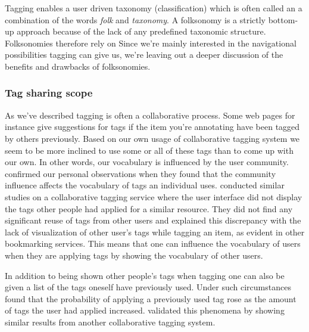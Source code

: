 Tagging enables a user driven taxonomy (classification)
which is often called an \dash{}a combination of the words
\emph{folk} and \emph{taxonomy}. A folksonomy is a strictly bottom-up
approach because of the lack of any predefined taxonomic structure.
Folksonomies therefore rely on 
Since we're mainly interested in the navigational possibilities tagging can
give us, we're leaving out a deeper discussion of the benefits and drawbacks
of folksonomies.%

\subsubsection{Tag sharing \oldand scope}
\label{section:social.navigation.applied.forms.tagging.sharing}

As we've described tagging is often a collaborative process. Some web pages
for instance give suggestions for tags if the item you're annotating have
been tagged by others previously. Based on our own usage of collaborative
tagging system we seem to be more inclined to use some or all of these tags
than to come up with our own. In other words, our vocabulary is influenced
by the user community. \citet[]{sen06} confirmed our personal
observations when they found that the community influence affects the
vocabulary of tags an individual uses. \citet[]{farooq07} conducted
similar studies on a collaborative tagging service where the user interface
did not display the tags other people had applied for a similar resource.
They did not find any significant reuse of tags from other users and explained
this discrepancy with the lack of visualization of other user's tags while
tagging an item, as
evident in other bookmarking services. This means that one can influence
the vocabulary of users when they are applying tags by showing the
vocabulary of other users.

In addition to being shown other people's tags when tagging one can also
be given a list of the tags oneself have previously used.
Under such circumstances \citet[]{sen06} found that the probability
of applying a previously used tag rose as the amount of tags the user had
applied increased. \citet[]{farooq07} validated this phenomena
by showing similar results from another collaborative tagging system.

